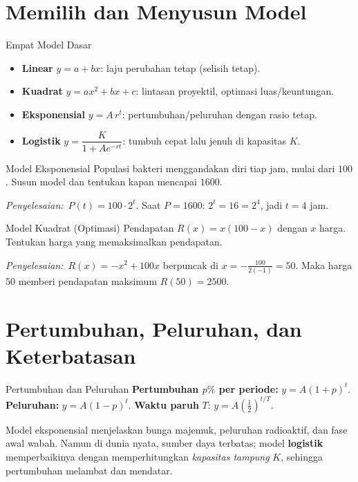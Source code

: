 \documentclass[11pt,a4paper]{report}
\theoremstyle{gaya}
\newcommand{\jawab}{\par\smallskip\noindent\textit{\textcolor{oranye}{Penyelesaian:}}\ }
\begin{document}
\section{Memilih dan Menyusun Model}
\begin{konsep}{Empat Model Dasar}
\begin{itemize}[leftmargin=*,topsep=2pt]
  \item \textbf{Linear} $y=a+bx$: laju perubahan tetap (selisih tetap).
  \item \textbf{Kuadrat} $y=ax^2+bx+c$: lintasan proyektil, optimasi luas/keuntungan.
  \item \textbf{Eksponensial} $y=A\,r^{t}$: pertumbuhan/peluruhan dengan rasio tetap.
  \item \textbf{Logistik} $y=\dfrac{K}{1+Ae^{-rt}}$: tumbuh cepat lalu jenuh di kapasitas $K$.
\end{itemize}
\end{konsep}

\begin{contoh}{Model Eksponensial}
Populasi bakteri menggandakan diri tiap jam, mulai dari $100$. Susun model dan tentukan kapan mencapai $1600$.

\jawab $P(t)=100\cdot2^{t}$. Saat $P=1600$: $2^t=16=2^4$, jadi $t=4$ jam.
\end{contoh}

\begin{contoh}{Model Kuadrat (Optimasi)}
Pendapatan $R(x)=x(100-x)$ dengan $x$ harga. Tentukan harga yang memaksimalkan pendapatan.

\jawab $R(x)=-x^2+100x$ berpuncak di $x=-\tfrac{100}{2(-1)}=50$. Maka harga $50$ memberi pendapatan maksimum $R(50)=2500$.
\end{contoh}

\section{Pertumbuhan, Peluruhan, dan Keterbatasan}
\begin{konsep}{Pertumbuhan dan Peluruhan}
\textbf{Pertumbuhan $p\%$ per periode:} $y=A(1+p)^t$. \textbf{Peluruhan:} $y=A(1-p)^t$. \textbf{Waktu paruh} $T$: $y=A\left(\tfrac12\right)^{t/T}$.
\end{konsep}

\begin{dunianyata}
Model eksponensial menjelaskan bunga majemuk, peluruhan radioaktif, dan fase awal wabah. Namun di dunia nyata, sumber daya terbatas; model \textbf{logistik} memperbaikinya dengan memperhitungkan \emph{kapasitas tampung} $K$, sehingga pertumbuhan melambat dan mendatar.
\end{dunianyata}
\end{document}
